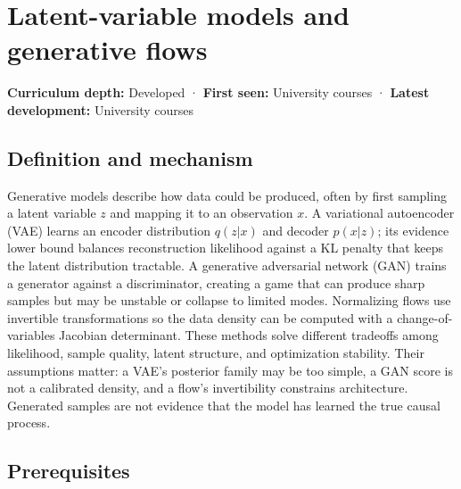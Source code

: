 \hypertarget{appendix-2c568f05ee34}{}\label{referencestart:appendix-2c568f05ee34}
\section{Latent-variable models and generative flows}\label{appendix-2c568f05ee34-latent-variable-models-and-generative-flows}

\textbf{Curriculum depth:} Developed · \textbf{First seen:} University courses · \textbf{Latest development:} University courses

\begin{allmightroledefinition}

\subsection{Definition and mechanism}\label{appendix-2c568f05ee34-definition-and-mechanism}

Generative models describe how data could be produced, often by first sampling a latent variable \(z\) and mapping it to an observation \(x\). A variational autoencoder (VAE) learns an encoder distribution \(q(z|x)\) and decoder \(p(x|z)\); its evidence lower bound balances reconstruction likelihood against a KL penalty that keeps the latent distribution tractable. A generative adversarial network (GAN) trains a generator against a discriminator, creating a game that can produce sharp samples but may be unstable or collapse to limited modes. Normalizing flows use invertible transformations so the data density can be computed with a change-of-variables Jacobian determinant. These methods solve different tradeoffs among likelihood, sample quality, latent structure, and optimization stability. Their assumptions matter: a VAE's posterior family may be too simple, a GAN score is not a calibrated density, and a flow's invertibility constrains architecture. Generated samples are not evidence that the model has learned the true causal process.

\end{allmightroledefinition}

\subsection{Prerequisites}\label{appendix-2c568f05ee34-prerequisites}

